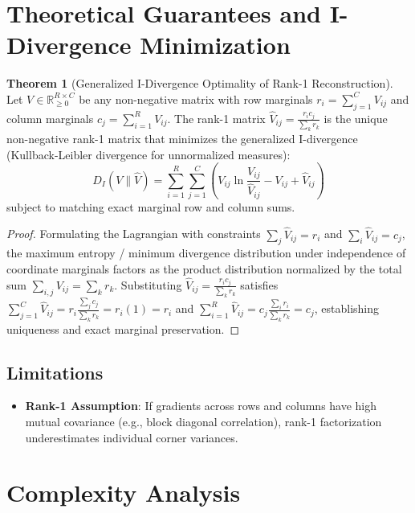 \documentclass[11pt,a4paper]{article}
\theoremstyle{definition}
\newtheorem{theorem}{Theorem}[section]
\begin{document}
\section{Theoretical Guarantees and I-Divergence Minimization}

\begin{theorem}[Generalized I-Divergence Optimality of Rank-1 Reconstruction]
Let $V \in \mathbb{R}_{\ge 0}^{R \times C}$ be any non-negative matrix with row marginals $r_i = \sum_{j=1}^C V_{ij}$ and column marginals $c_j = \sum_{i=1}^R V_{ij}$. The rank-1 matrix $\hat{V}_{ij} = \frac{r_i c_j}{\sum_k r_k}$ is the unique non-negative rank-1 matrix that minimizes the generalized I-divergence (Kullback-Leibler divergence for unnormalized measures):
\begin{equation}
D_{I}(V \parallel \hat{V}) = \sum_{i=1}^R \sum_{j=1}^C \left( V_{ij} \ln \frac{V_{ij}}{\hat{V}_{ij}} - V_{ij} + \hat{V}_{ij} \right)
\end{equation}
subject to matching exact marginal row and column sums.
\end{theorem}

\begin{proof}
Formulating the Lagrangian with constraints $\sum_j \hat{V}_{ij} = r_i$ and $\sum_i \hat{V}_{ij} = c_j$, the maximum entropy / minimum divergence distribution under independence of coordinate marginals factors as the product distribution normalized by the total sum $\sum_{i, j} V_{ij} = \sum_k r_k$. Substituting $\hat{V}_{ij} = \frac{r_i c_j}{\sum_k r_k}$ satisfies $\sum_{j=1}^C \hat{V}_{ij} = r_i \frac{\sum_j c_j}{\sum_k r_k} = r_i (1) = r_i$ and $\sum_{i=1}^R \hat{V}_{ij} = c_j \frac{\sum_i r_i}{\sum_k r_k} = c_j$, establishing uniqueness and exact marginal preservation.
\end{proof}

\subsection{Limitations}
\begin{itemize}
    \item \textbf{Rank-1 Assumption}: If gradients across rows and columns have high mutual covariance (e.g., block diagonal correlation), rank-1 factorization underestimates individual corner variances.
\end{itemize}

\section{Complexity Analysis}
\end{document}
